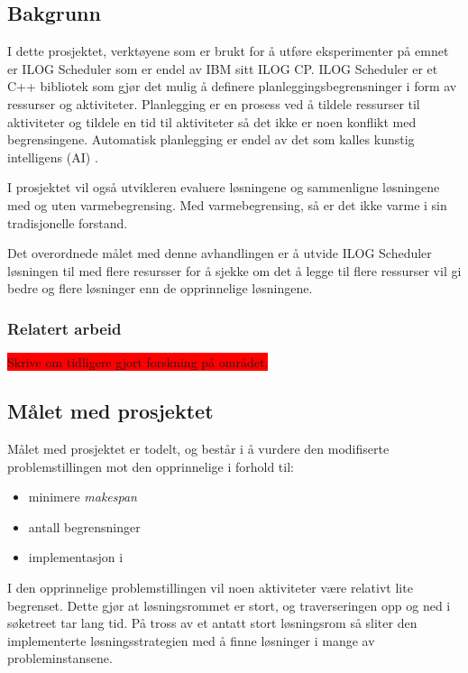 \subsection{Bakgrunn}
I dette prosjektet, verktøyene som er brukt for å utføre eksperimenter på emnet er ILOG Scheduler som er endel av IBM sitt ILOG CP. ILOG Scheduler er et C++ bibliotek som gjør det mulig å definere planleggingsbegrensninger i form av ressurser og aktiviteter. Planlegging er en prosess ved å tildele ressurser til aktiviteter og tildele en tid til aktiviteter så det ikke er noen konflikt med begrensingene.\cite{Pape94implementationof} Automatisk planlegging er endel av det som kalles kunstig intelligens (AI) .

I prosjektet vil også utvikleren evaluere løsningene og sammenligne løsningene med og uten varmebegrensing. Med varmebegrensing, så er det ikke varme i sin tradisjonelle forstand.

Det overordnede målet med denne avhandlingen er å utvide ILOG Scheduler løsningen til \bht med flere resursser for å sjekke om det å legge til flere ressurser vil gi bedre og flere løsninger enn de opprinnelige løsningene.

\subsubsection{Relatert arbeid}
\colorbox{red}{Skrive om tidligere gjort forskning på området.}

\subsection{Målet med prosjektet}
Målet med prosjektet er todelt, og består i å vurdere den modifiserte problemstillingen mot den opprinnelige i forhold til:
\begin{itemize}
\item minimere \textit{makespan}
\item antall begrensninger
\item implementasjon i \ilog
\end{itemize}

I den opprinnelige problemstillingen vil noen aktiviteter være relativt lite begrenset. Dette gjør at løsningsrommet er stort, og traverseringen opp og ned i søketreet tar lang tid. På tross av et antatt stort løsningsrom så sliter den \ilog implementerte løsningsstrategien med å finne løsninger i mange av probleminstansene.

